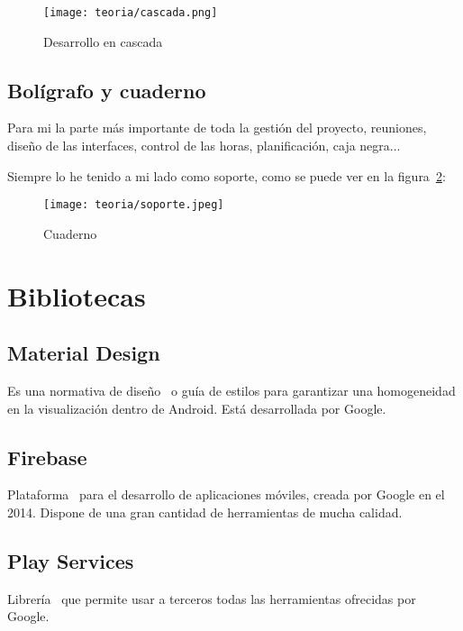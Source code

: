 \begin{figure}%
	\centering
	\texttt{[image: teoria/cascada.png]}
	\caption{Desarrollo en cascada}\label{fig:cascada}
\end{figure}

\subsection{Bolígrafo y cuaderno}
Para mi la parte más importante de toda la gestión del proyecto, reuniones, diseño de las interfaces, control de las horas, planificación, caja negra... 

Siempre lo he tenido a mi lado como soporte, como se puede ver en la figura~\ref{fig:soporte}:

\begin{figure}%
	\centering
	\texttt{[image: teoria/soporte.jpeg]}
	\caption{Cuaderno}\label{fig:soporte}
\end{figure}

\section{Bibliotecas}

\subsection{Material Design}
Es una normativa de diseño~\cite{google:material} o guía de estilos para garantizar una homogeneidad en la visualización dentro de Android. Está desarrollada por Google.

\subsection{Firebase}
Plataforma~\cite{google:firebase} para el desarrollo de aplicaciones móviles, creada por Google en el 2014. Dispone de una gran cantidad de herramientas de mucha calidad.

\subsection{Play Services }
Librería~\cite{google:playservices} que permite usar a terceros todas las herramientas ofrecidas por Google.